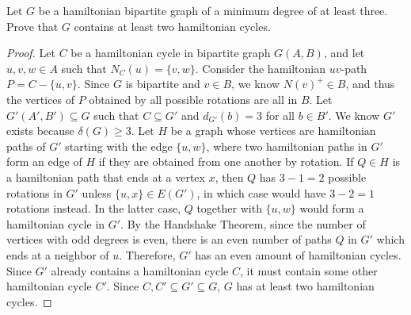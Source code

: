 \documentclass{article}
\newenvironment{problem}[2][Question]{\begin{trivlist}
\item[\hskip \labelsep {\bfseries #1}\hskip \labelsep {\bfseries #2.}]}{\end{trivlist}}
\begin{document}
\begin{problem}{2.5.11}
    Let $G$ be a hamiltonian bipartite graph of a minimum degree of at least three. Prove that $G$ contains at least two hamiltonian cycles.
\end{problem}
\begin{proof}
    Let $C$ be a hamiltonian cycle in bipartite graph $G(A,B)$, and let $u, v, w \in A$ such that $N_C(u) = \{v, w\}$. Consider the hamiltonian $uv$-path $P = C - \{u, v\}$. Since $G$ is bipartite and $v \in B$, we know $N(v)^+ \in B$, and thus the vertices of $P$ obtained by all possible rotations are all in $B$. Let $G'(A', B') \subseteq G$ such that $C \subseteq G'$ and $d_{G'}(b) = 3$ for all $b \in B'$. We know $G'$ exists because $\delta(G) \geq 3$. Let $H$ be a graph whose vertices are hamiltonian paths of $G'$ starting with the edge $\{u, w\}$, where two hamiltonian paths in $G'$ form an edge of $H$ if they are obtained from one another by rotation. If $Q \in H$ is a hamiltonian path that ends at a vertex $x$, then $Q$ has $3 - 1 = 2$ possible rotations in $G'$ unless $\{u, x\} \in E(G')$, in which case would have $3 - 2 = 1$ rotations instead. In the latter case, $Q$ together with $\{u, w\}$ would form a hamiltonian cycle in $G'$. By the Handshake Theorem, since the number of
    vertices with odd degrees is even, there is an even number of paths $Q$ in $G'$ which ends at a neighbor of $u$. Therefore, $G'$ has an even amount of hamiltonian cycles. Since $G'$ already contains a hamiltonian cycle $C$, it must contain some other hamiltonian cycle $C'$. Since $C, C' \subseteq G' \subseteq G$, $G$ has at least two hamiltonian cycles.
\end{proof}

\newpage
\end{document}
